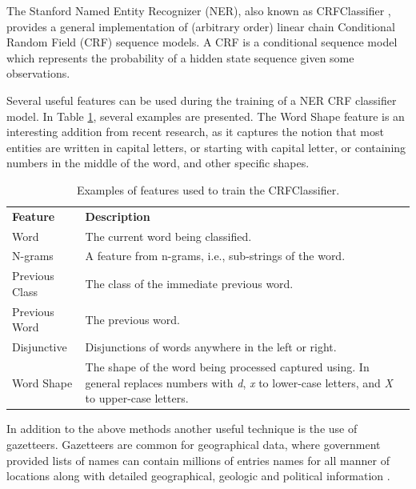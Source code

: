 \documentclass[11pt,a4paper,openright]{memoir}
\begin{document}
The Stanford Named Entity Recognizer (NER), also known as CRFClassifier \cite{Finkel:2005:INI:1219840.1219885}, provides a general implementation of (arbitrary order) linear chain Conditional Random Field (CRF) sequence models. A CRF is a conditional sequence model which represents the probability of a hidden state sequence given some observations.

Several useful features can be used during the training of a NER CRF classifier model. In Table \ref{tab:ner_features}, several examples are presented. The Word Shape feature is an interesting addition from recent research, as it captures the notion that most entities are written in capital letters, or starting with capital letter, or containing numbers in the middle of the word, and other specific shapes.

\begin{table}[!htbp]
  \centering
    \begin{tabular}{ll}
      \textbf{Feature}          & \textbf{Description} \\
      Word                      & The current word being classified.          \\
      N-grams                   & \parbox[t]{9cm}{A feature from n-grams, i.e., sub-strings of the word.} \\
      Previous Class            & The class of the immediate previous word.          \\
      Previous Word             & The previous word.          \\
      Disjunctive               & \parbox[t]{9cm}{Disjunctions of words anywhere in the left or right.} \\
      Word Shape                & \parbox[t]{9cm}{The shape of the word being processed captured using. In general replaces numbers with \emph{d}, \emph{x} to lower-case letters, and \emph{X} to upper-case letters.} \\
    \end{tabular}
  \caption[Possible features to train the CRFClassifier.]{Examples of features used to train the CRFClassifier.}
  \label{tab:ner_features}
\end{table}

In addition to the above methods another useful technique is the use of gazetteers. Gazetteers are common for geographical data, where government provided lists of names can contain millions of entries names for all manner of locations along with detailed geographical, geologic and political information \cite{Jurafsky:2000:SLP:555733}.
\end{document}
